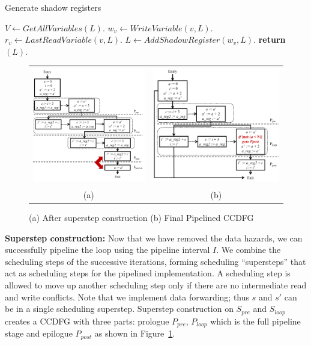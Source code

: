 \begin{algorithm}[H]
\caption{Generate shadow registers} 
\label{algo:generate-pipeline-registers}
\begin{algorithmic}[1]
\State $V \leftarrow GetAllVariables(L)$.
\State $w_v \leftarrow WriteVariable (v, L)$.
\State $r_v \leftarrow LastReadVariable (v, L)$.
\State $L \leftarrow AddShadowRegister (w_v, L)$.
\EndIf
\EndFor
\State \textbf{return} $(L)$.
\EndProcedure
\end{algorithmic}
\end{algorithm}



\begin{figure}[t!]
\begin{center}
\begin{tabular}{cc}
\includegraphics[height=2in]{fig-proposal/algorithm-after-superstep-construction}
&
\includegraphics[height=2in]{fig-proposal/algorithm-after-adding-branches}
\\
(a) & (b)
\\
\end{tabular}
\end{center}
\caption{(a) After superstep construction (b) Final Pipelined CCDFG}
\label{fig:algo3-2}
\end{figure}

{\bf Superstep construction:} Now that we have removed the data hazards, we can successfully pipeline the loop using  the pipeline interval $I$. We combine the scheduling steps of the successive iterations, forming scheduling ``supersteps'' that act as scheduling steps for the pipelined
implementation. A scheduling step is allowed to move up another scheduling step only if there are no intermediate read and write conflicts. Note that we implement data forwarding; thus $s$ and $s'$ can be in a single scheduling superstep.
Superstep construction on $S_{pre}$ and $S_{loop}$ creates a CCDFG with three parts: prologue $P_{pre}$, $P_{loop}$ which is the full pipeline stage and epilogue $P_{post}$ as shown in Figure~\ref{fig:algo3-2}. 

